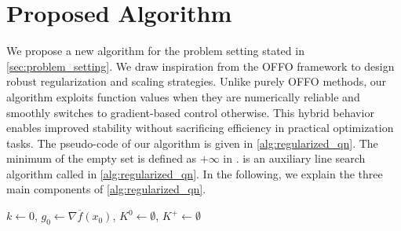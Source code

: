 \documentclass[journal]{subfiles}
\begin{document}
\section{Proposed Algorithm}\label{sec:algorithm}

We propose a new algorithm for the problem setting stated in \cref{sec:problem_setting}.
We draw inspiration from the OFFO framework to design robust regularization and scaling strategies.
Unlike purely OFFO methods, our algorithm exploits function values when they are numerically reliable and smoothly switches to gradient-based control otherwise.
This hybrid behavior enables improved stability without sacrificing efficiency in practical optimization tasks.
The pseudo-code of our algorithm is given in \cref{alg:regularized_qn}. The minimum of the empty set is defined as $+\infty$ in .
 is an auxiliary line search algorithm called in \cref{alg:regularized_qn}.
In the following, we explain the three main components of \cref{alg:regularized_qn}.

\DontPrintSemicolon
\begin{algorithm}[ht]
    \normalsize
    $k \gets 0$, $g_0 \gets \nabla \overline{f}(x_0)$, $K^0 \gets \emptyset$, $K^+ \gets \emptyset$ \label{line:init}\;
    \caption{Noise Tolerant Regularized Quasi-Newton Method}
    \label{alg:regularized_qn}
\end{algorithm}
\end{document}

